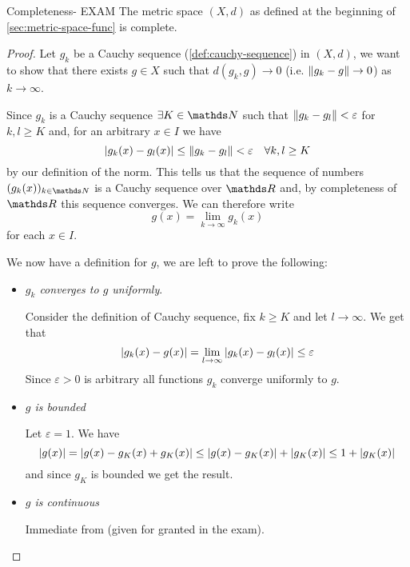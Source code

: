 \documentclass[12pt]{extarticle}
\begin{document}
\begin{theorem}{Completeness- EXAM}{}
	The metric space $(X, d)$ as defined at the beginning of \cref{sec:metric-space-func} is complete.
\end{theorem}
\begin{proof}
	Let $g_k$ be a Cauchy sequence (\cref{def:cauchy-sequence}) in $(X, d)$,
	we want to show that there exists $g \in X$ such that $d(g_k, g) \to 0$ (i.e. $\norm{g_k - g} \to 0$) as $k \to \infty$.

	Since $g_k$ is a Cauchy sequence $\exists K \in \N$ such that $\norm{g_k - g_l} < \varepsilon$ for $k, l \geq K$ and, for an arbitrary $x \in I$ we have
	\begin{equation}
		\abs{g_k(x)-g_l(x)} \leq \norm{g_k - g_l} < \varepsilon \quad \forall k, l \geq K
	\end{equation}
	by our definition of the norm.
	This tells us that the sequence of numbers $(g_k(x))_{k \in \N}$ is a Cauchy sequence over $\R$ and, by completeness of $\R$ this sequence converges.
	We can therefore write
	\begin{equation}
		g(x) = \lim_{k \to \infty} g_k(x)
	\end{equation}
	for each $x \in I$.

	We now have a definition for $g$, we are left to prove the following:
	\begin{itemize}
		\item \emph{$g_k$ converges to $g$ uniformly}.

		      Consider the definition of Cauchy sequence, fix $k \geq K$ and let $l \to \infty$.
		      We get that
		      \begin{equation}
			      \abs{g_k(x) - g(x)} = \lim_{l \to \infty} \abs{g_k(x) - g_l(x)} \leq \varepsilon
		      \end{equation}
		      Since $\varepsilon > 0$ is arbitrary all functions $g_k$ converge uniformly to $g$.

		\item \emph{$g$ is bounded}

		      Let $\varepsilon = 1$.
		      We have
		      \begin{equation}
			      \abs{g(x)} = \abs{g(x) - g_K(x) + g_K(x)} \leq \abs{g(x) - g_K(x)} + \abs{g_K(x)} \leq 1 + \abs{g_K(x)}
		      \end{equation}
		      and since $g_K$ is bounded we get the result.

		\item \emph{$g$ is continuous}

		      Immediate from 
		      (given for granted in the exam).
	\end{itemize}
\end{proof}
\end{document}
